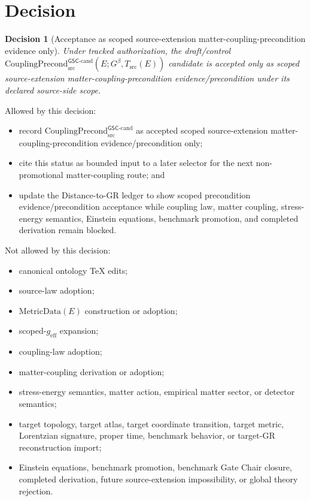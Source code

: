 \documentclass[11pt]{article}
\newcommand{\Gbeta}{G^\beta}
\newcommand{\geff}{g_{\mathrm{eff}}}
\newcommand{\CouplingPrecond}{\mathrm{CouplingPrecond}^{\mathsf{GSC}\mbox{-}\mathrm{cand}}_{\mathrm{src}}}
\newcommand{\MetricData}{\mathrm{MetricData}}
\newtheorem{decision}{Decision}
\begin{document}
\section{Decision}

\begin{decision}[Acceptance as scoped source-extension matter-coupling-precondition evidence only]
Under tracked authorization, the draft/control
\(\CouplingPrecond(E;\Gbeta,T_{\mathrm{src}}(E))\) candidate is accepted only
as scoped source-extension matter-coupling-precondition evidence/precondition
under its declared source-side scope.
\end{decision}

Allowed by this decision:
\begin{itemize}[leftmargin=*]
  \item record \(\CouplingPrecond\) as accepted scoped source-extension
  matter-coupling-precondition evidence/precondition only;
  \item cite this status as bounded input to a later selector for the next
  non-promotional matter-coupling route; and
  \item update the Distance-to-GR ledger to show scoped precondition
  evidence/precondition acceptance while coupling law, matter coupling,
  stress-energy semantics, Einstein equations, benchmark promotion, and
  completed derivation remain blocked.
\end{itemize}

Not allowed by this decision:
\begin{itemize}[leftmargin=*]
  \item canonical ontology TeX edits;
  \item source-law adoption;
  \item \(\MetricData(E)\) construction or adoption;
  \item scoped-\(\geff\) expansion;
  \item coupling-law adoption;
  \item matter-coupling derivation or adoption;
  \item stress-energy semantics, matter action, empirical matter sector, or
  detector semantics;
  \item target topology, target atlas, target coordinate transition, target
  metric, Lorentzian signature, proper time, benchmark behavior, or target-GR
  reconstruction import;
  \item Einstein equations, benchmark promotion, benchmark Gate Chair closure,
  completed derivation, future source-extension impossibility, or global
  theory rejection.
\end{itemize}
\end{document}

